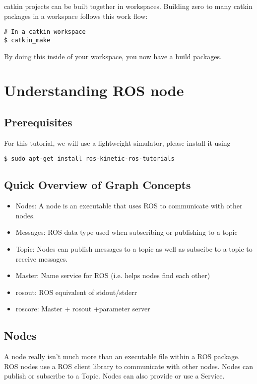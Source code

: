 \noindent catkin projects can be built together in workspaces. Building zero to many catkin packages in a workspace follows this work flow:

\begin{lstlisting}[breaklines=true languages=bash]
# In a catkin workspace
$ catkin_make
\end{lstlisting}

By doing this inside of your workspace, you now have a build packages.

\section{Understanding ROS node}

\subsection{Prerequisites}
For this tutorial, we will use a lightweight simulator, please install it using
\begin{lstlisting}[breaklines=true languages=bash]
$ sudo apt-get install ros-kinetic-ros-tutorials
\end{lstlisting}

\subsection{Quick Overview of Graph Concepts}

\begin{itemize}
	\item Nodes: A node is an executable that uses ROS to communicate with other nodes.
	\item Messages: ROS data type used when subscribing or publishing to a topic
	\item Topic: Nodes can publish messages to a topic as well as subscibe to a topic to receive messages.
	\item Master: Name service for ROS (i.e. helps nodes find each other)
	\item rosout: ROS equivalent of stdout/stderr
	\item roscore: Master + rosout +parameter server
\end{itemize}

\subsection{Nodes}
A node really isn't much more than an executable file within a ROS package. ROS nodes use a ROS client library to communicate with other nodes. Nodes can publish or subscribe to a Topic. Nodes can also provide or use a Service.

